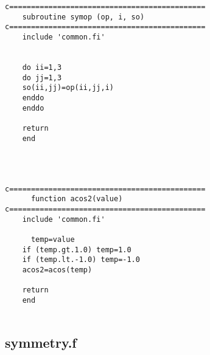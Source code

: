 \begin{lstlisting}
c=============================================
	subroutine symop (op, i, so)
c=============================================
	include 'common.fi'
	

	do ii=1,3
	do jj=1,3
	so(ii,jj)=op(ii,jj,i)
	enddo
	enddo

	return
	end




c=============================================
      function acos2(value)
c=============================================
	include 'common.fi'
	
      temp=value
	if (temp.gt.1.0) temp=1.0
	if (temp.lt.-1.0) temp=-1.0
	acos2=acos(temp)
	
	return
	end
	  
  \end{lstlisting}

\subsection{symmetry.f}

